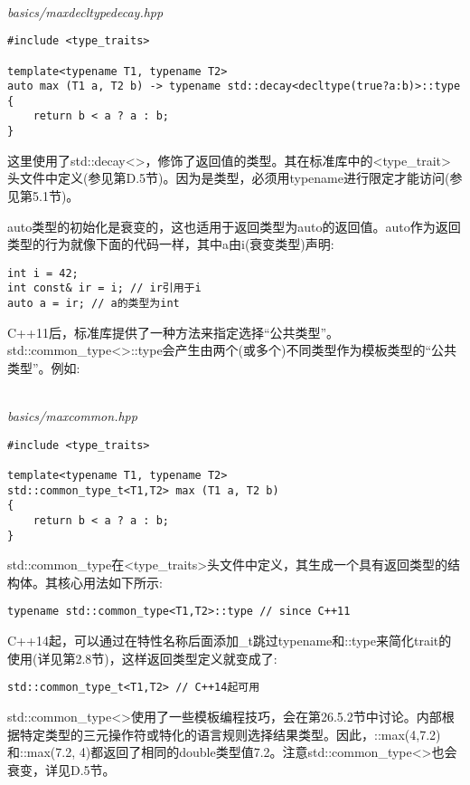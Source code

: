 \hspace*{\fill} \\ %
\noindent
\textit{basics/maxdecltypedecay.hpp}
\begin{lstlisting}[style=styleCXX]
#include <type_traits>

template<typename T1, typename T2>
auto max (T1 a, T2 b) -> typename std::decay<decltype(true?a:b)>::type
{
	return b < a ? a : b;
}
\end{lstlisting}

这里使用了std::decay<>，修饰了返回值的类型。其在标准库中的<type\_trait>头文件中定义(参见第D.5节)。因为是类型，必须用typename进行限定才能访问(参见第5.1节)。

auto类型的初始化是衰变的，这也适用于返回类型为auto的返回值。auto作为返回类型的行为就像下面的代码一样，其中a由i(衰变类型)声明:

\begin{lstlisting}[style=styleCXX]
int i = 42;
int const& ir = i; // ir引用于i
auto a = ir; // a的类型为int
\end{lstlisting}


C++11后，标准库提供了一种方法来指定选择“公共类型”。std::common\_type<>::type会产生由两个(或多个)不同类型作为模板类型的“公共类型”。例如:

\hspace*{\fill} \\ %
\noindent
\textit{basics/maxcommon.hpp}
\begin{lstlisting}[style=styleCXX]
#include <type_traits>

template<typename T1, typename T2>
std::common_type_t<T1,T2> max (T1 a, T2 b)
{
	return b < a ? a : b;
}
\end{lstlisting}

std::common\_type在<type\_traits>头文件中定义，其生成一个具有返回类型的结构体。其核心用法如下所示:

\begin{lstlisting}[style=styleCXX]
typename std::common_type<T1,T2>::type // since C++11
\end{lstlisting}

C++14起，可以通过在特性名称后面添加\_t跳过typename和::type来简化trait的使用(详见第2.8节)，这样返回类型定义就变成了:

\begin{lstlisting}[style=styleCXX]
std::common_type_t<T1,T2> // C++14起可用
\end{lstlisting}

std::common\_type<>使用了一些模板编程技巧，会在第26.5.2节中讨论。内部根据特定类型的三元操作符或特化的语言规则选择结果类型。因此，::max(4,7.2)和::max(7.2, 4)都返回了相同的double类型值7.2。注意std::common\_type<>也会衰变，详见D.5节。




